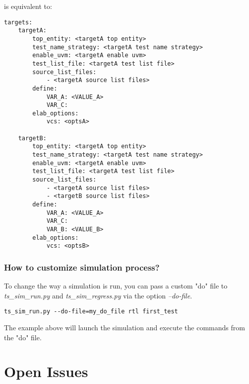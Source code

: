 \documentclass{tropic_design_spec}
\begin{document}
is equivalent to:

\begin{lstlisting}
targets:
    targetA:
        top_entity: <targetA top entity>
        test_name_strategy: <targetA test name strategy>
        enable_uvm: <targetA enable uvm>
        test_list_file: <targetA test list file>
        source_list_files:
            - <targetA source list files>
        define:
            VAR_A: <VALUE_A>
            VAR_C:
        elab_options:
            vcs: <optsA>

    targetB:
        top_entity: <targetA top entity>
        test_name_strategy: <targetA test name strategy>
        enable_uvm: <targetA enable uvm>
        test_list_file: <targetA test list file>
        source_list_files:
            - <targetA source list files>
            - <targetB source list files>
        define:
            VAR_A: <VALUE_A>
            VAR_C:
            VAR_B: <VALUE_B>
        elab_options:
            vcs: <optsB>
\end{lstlisting}


\subsubsection{How to customize simulation process?}
\label{sec:how-to-customize-simulation-process}

To change the way a simulation is run, you can pass a custom "do" file to
\textit{ts_sim_run.py} and \textit{ts_sim_regress.py} via the option \textit{--do-file}.

\begin{lstlisting}
ts_sim_run.py --do-file=my_do_file rtl first_test
\end{lstlisting}

The example above will launch the simulation and execute the commands from the "do" file.


\pagebreak
\section{Open Issues}

\PrintOpenIssueSummary
\end{document}
